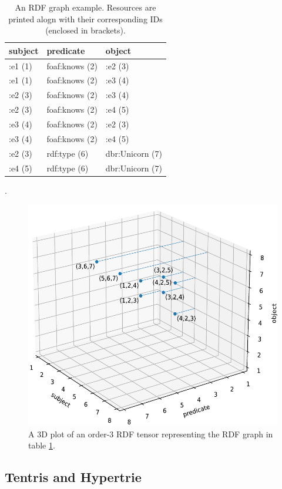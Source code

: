 \begin{table}[h]
	\centering
	\begin{tabular}{lll}
		\textbf{subject} & \textbf{predicate} & \textbf{object} \\ \hline
		:e1 (1) & foaf:knows (2) & :e2 (3) \\
		:e1 (1) & foaf:knows (2) & :e3 (4) \\
		:e2 (3) & foaf:knows (2) & :e3 (4) \\
		:e2 (3) & foaf:knows (2) & :e4 (5)  \\
		:e3 (4) & foaf:knows (2) & :e2 (3) \\ 
		:e3 (4) & foaf:knows (2) & :e4 (5) \\
		:e2 (3) & rdf:type (6) & dbr:Unicorn (7) \\
		:e4 (5) & rdf:type (6) & dbr:Unicorn (7) \\
	\end{tabular}
	\caption{An RDF graph example. Resources are printed alogn with their corresponding IDs (enclosed in brackets).}. 
	\label{tab:rdf_tensor}
\end{table}

\begin{figure}[h]
	\centering
	\includegraphics{figures/chapter2/3Dcoord-cut}
	\caption{A 3D plot of an order-3 RDF tensor representing the RDF graph in table \ref{tab:rdf_tensor}.}
	\label{fig:rdf_tensor}
\end{figure}

\subsection{Tentris and Hypertrie}
\label{sec:hypertrie}